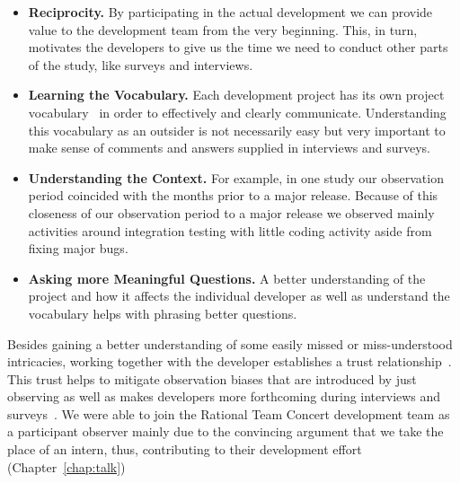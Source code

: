 \begin{itemize}
\item\textbf{Reciprocity.} By participating in the actual development we can provide value to the development team from the very beginning.
This, in turn, motivates the developers to give us the time we need to conduct other parts of the study, like surveys and interviews.
\item\textbf{Learning the Vocabulary.} Each development project has its own project vocabulary~\cite{espinosa2007:team_knowledge} in order to effectively and clearly communicate. 
Understanding this vocabulary as an outsider is not necessarily easy but very important to make sense of comments and answers supplied in interviews and surveys.
\item\textbf{Understanding the Context.} For example, in one study our observation period coincided with the months prior to a major release. 
Because of this closeness of our observation period to a major release we observed mainly activities around integration testing with little coding activity aside from fixing major bugs.


\item\textbf{Asking more Meaningful Questions.} A better understanding of the project and how it affects the individual developer as well as understand the vocabulary helps with phrasing better questions.
\end{itemize}

Besides gaining a better understanding of some easily missed or miss-understood intricacies, working together with the developer establishes a trust relationship~\cite{letherbridge:ese2005}.
This trust helps to mitigate observation biases that are introduced by just observing as well as makes developers more forthcoming during interviews and surveys~\cite{letherbridge:ese2005}.
We were able to join the Rational Team Concert development team as a participant observer mainly due to the convincing argument that we take the place of an intern, thus, contributing to their development effort (Chapter~\ref{chap:talk})

